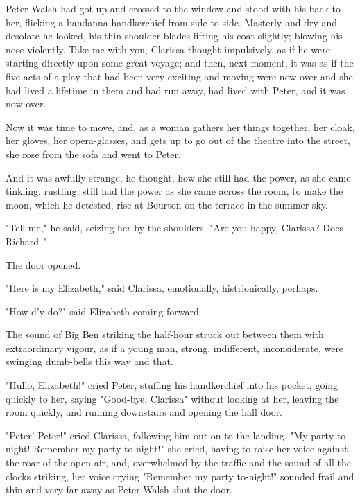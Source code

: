 \documentclass[lang=cn,10pt]{elegantbook}
\begin{document}
Peter Walsh had got up and crossed to the window and stood with his
back to her, flicking a bandanna handkerchief from side to side.
Masterly and dry and desolate he looked, his thin shoulder-blades
lifting his coat slightly; blowing his nose violently.  Take me
with you, Clarissa thought impulsively, as if he were starting
directly upon some great voyage; and then, next moment, it was as
if the five acts of a play that had been very exciting and moving
were now over and she had lived a lifetime in them and had run
away, had lived with Peter, and it was now over.

Now it was time to move, and, as a woman gathers her things
together, her cloak, her gloves, her opera-glasses, and gets up to
go out of the theatre into the street, she rose from the sofa and
went to Peter.

And it was awfully strange, he thought, how she still had the
power, as she came tinkling, rustling, still had the power as she
came across the room, to make the moon, which he detested, rise at
Bourton on the terrace in the summer sky.

"Tell me," he said, seizing her by the shoulders.  "Are you happy,
Clarissa?  Does Richard--"

The door opened.

"Here is my Elizabeth," said Clarissa, emotionally, histrionically,
perhaps.

"How d'y do?" said Elizabeth coming forward.

The sound of Big Ben striking the half-hour struck out between them
with extraordinary vigour, as if a young man, strong, indifferent,
inconsiderate, were swinging dumb-bells this way and that.

"Hullo, Elizabeth!" cried Peter, stuffing his handkerchief into his
pocket, going quickly to her, saying "Good-bye, Clarissa" without
looking at her, leaving the room quickly, and running downstairs
and opening the hall door.

"Peter!  Peter!" cried Clarissa, following him out on to the
landing.  "My party to-night!  Remember my party to-night!" she
cried, having to raise her voice against the roar of the open air,
and, overwhelmed by the traffic and the sound of all the clocks
striking, her voice crying "Remember my party to-night!" sounded
frail and thin and very far away as Peter Walsh shut the door.
\end{document}

